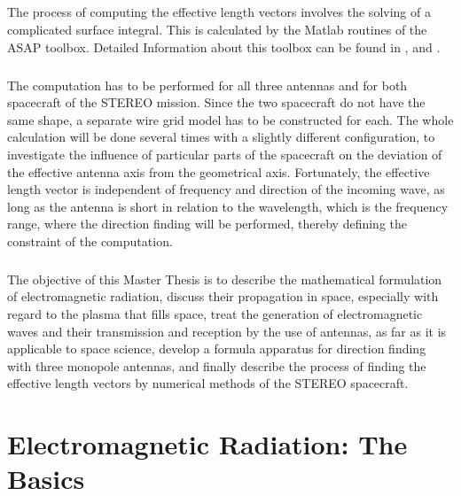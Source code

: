 \documentclass[a4paper,10pt]{thesis}
\begin{document}
\paragraph*{}
The process of computing the effective length vectors involves the solving of a complicated surface integral. This is calculated by the Matlab routines of the ASAP toolbox. Detailed Information about this toolbox can be found in \cite{toolbox}, \cite{toolbox2}
and \cite{antenna_report_1} .

\paragraph*{}
The computation has to be performed for all three antennas and for both spacecraft of the STEREO mission. Since the two spacecraft do not have the same shape, a separate wire grid model has to be constructed for each. The whole calculation will be done several times with a slightly different configuration, to investigate the influence of particular parts of the spacecraft on the deviation of the effective antenna axis from the geometrical axis. Fortunately, the effective length vector is independent of frequency and direction of the incoming wave, as long as the antenna is short in relation to the wavelength, which is the frequency range, where the direction finding will be performed, thereby defining the constraint of the computation.
\paragraph*{}
The objective of this Master Thesis is to describe the mathematical formulation of electromagnetic radiation, discuss their propagation in space, especially with regard to the plasma that fills space, treat the generation of electromagnetic waves and their transmission and reception by the use of antennas, as far as it is applicable to space science, develop a formula apparatus for direction finding with three monopole antennas, and finally describe the process of finding the effective length vectors by numerical methods of the STEREO spacecraft. 

\chapter{\textbf{Electromagnetic Radiation: The Basics}}
\end{document}
